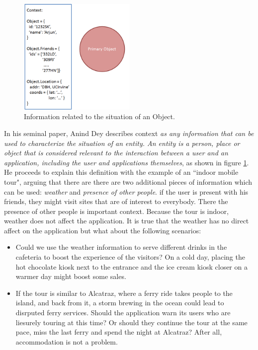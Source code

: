 \begin{figure}[t]
\centering
\includegraphics[width=0.5\textwidth]{media/chapter2/dey-def.png}
\caption{Information related to the situation of an Object.}
\label{fig:anind-def}
\end{figure}

In his seminal paper, Anind Dey \cite{dey2001understanding} describes context \textit{as any information that can be used to characterize the situation of an entity. An entity is a person, place or object that is considered relevant to the interaction between a user and an application, including the user and applications themselves}, as shown in figure \ref{fig:anind-def}. He proceeds to explain this definition with the example of an ``indoor mobile tour", arguing that there are there are two additional pieces of information which can be used: \textit{weather} and \textit{presence of other people}. if the user is present with his friends, they might visit sites that are of interest to everybody. There the presence of other people is important context. Because the tour is indoor, weather does not affect the application. It is true that the weather has no direct affect on the application but what about the following scenarios:

\begin{itemize}
\item Could we use the weather information to serve different drinks in the cafeteria to boost the experience of the visitors? On a cold day, placing the hot chocolate kiosk next to the entrance and the ice cream kiosk closer on a warmer day might boost some sales.
\item If the tour is similar to Alcatraz, where a ferry ride takes people to the island, and back from it, a storm brewing in the ocean could lead to disrputed ferry services. Should the application warn its users who are liesurely touring at this time? Or should they continue the tour at the same pace, miss the last ferry and spend the night at Alcatraz? After all, accommodation is not a problem.
\end{itemize}

